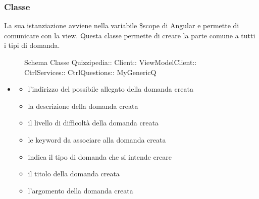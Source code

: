 \subsubsection{Classe }
La sua istanziazione avviene nella variabile \$scope di Angular e permette di comunicare con la view. Questa classe permette di creare la parte comune a tutti i tipi di domanda.
\begin{figure}[H]
\centering
\noindent{}
\caption[Schema Classe MyGenericQ]{Schema Classe Quizzipedia:: Client:: ViewModelClient:: CtrlServices:: CtrlQuestions:: MyGenericQ}
\end{figure}
\begin{itemize}
\item {}
\begin{itemize}
\item {}
\newline
l'indirizzo del possibile allegato della domanda creata
\item {}
\newline
la descrizione della domanda creata
\item {}
\newline
il livello di difficoltà della domanda creata
\item {}
\newline
le keyword da associare alla domanda creata
\item {}
\newline
indica il tipo di domanda che si intende creare
\item {}
\newline
il titolo della domanda creata
\item {}
\newline
l'argomento della domanda creata
\end{itemize}
\end{itemize}
